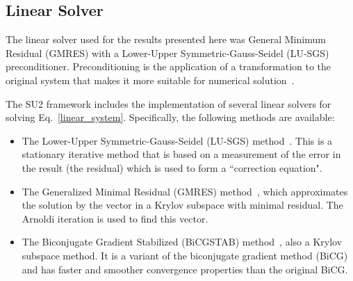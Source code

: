 
\subsection*{Linear Solver}
The linear solver used for the results presented here was General Minimum Residual (GMRES) with a Lower-Upper Symmetric-Gauss-Seidel (LU-SGS) preconditioner. Preconditioning is the application of a transformation to the original system that makes it more suitable for numerical solution~\cite{pierce-1997}.


The SU2 framework includes the implementation of several linear solvers for solving Eq.~\ref{linear_system}. Specifically, the following methods are available:
\begin{itemize}
\item The Lower-Upper Symmetric-Gauss-Seidel (LU-SGS) method~\cite{yoon88, jameson81b, jameson87}. This is a stationary iterative method that is based on a measurement of the error in the result (the residual) which is used to form a ``correction equation".
\item The Generalized Minimal Residual (GMRES) method~\cite{saad1986}, which approximates the solution by the vector in a Krylov subspace with minimal residual. The Arnoldi iteration is used to find this vector.
\item The Biconjugate Gradient Stabilized  (BiCGSTAB) method~\cite{Vorst1992}, also a Krylov subspace method. It is a variant of the biconjugate gradient method (BiCG) and has faster and smoother convergence properties than the original BiCG.
\end{itemize}


